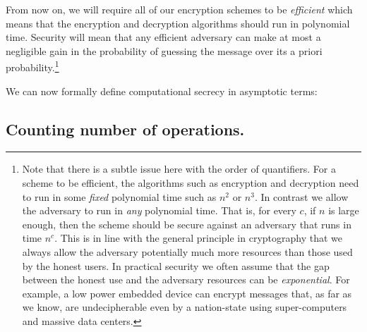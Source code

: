 From now on, we will require all of our encryption schemes to be
\emph{efficient} which means that the encryption and decryption
algorithms should run in polynomial time. Security will mean that any
efficient adversary can make at most a negligible gain in the
probability of guessing the message over its a priori
probability.\footnote{Note that there is a subtle issue here with the
  order of quantifiers. For a scheme to be efficient, the algorithms
  such as encryption and decryption need to run in some \emph{fixed}
  polynomial time such as \(n^2\) or \(n^3\). In contrast we allow the
  adversary to run in \emph{any} polynomial time. That is, for every
  \(c\), if \(n\) is large enough, then the scheme should be secure
  against an adversary that runs in time \(n^c\). This is in line with
  the general principle in cryptography that we always allow the
  adversary potentially much more resources than those used by the
  honest users. In practical security we often assume that the gap
  between the honest use and the adversary resources can be
  \emph{exponential}. For example, a low power embedded device can
  encrypt messages that, as far as we know, are undecipherable even by a
  nation-state using super-computers and massive data centers.}

We can now formally define computational secrecy in asymptotic terms:

\hypertarget{compsecdef}{}

\subsection{Counting number of operations.}\label{countoperation}

